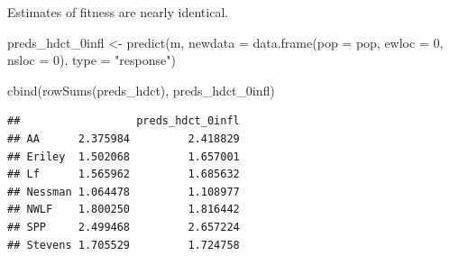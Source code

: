 \documentclass[
  ignorenonframetext,
]{beamer}
\newenvironment{Shaded}{\begin{snugshade}}{\end{snugshade}}
\newcommand{\AttributeTok}[1]{\textcolor[rgb]{0.77,0.63,0.00}{#1}}
\newcommand{\DecValTok}[1]{\textcolor[rgb]{0.00,0.00,0.81}{#1}}
\newcommand{\FunctionTok}[1]{\textcolor[rgb]{0.00,0.00,0.00}{#1}}
\newcommand{\NormalTok}[1]{#1}
\newcommand{\OtherTok}[1]{\textcolor[rgb]{0.56,0.35,0.01}{#1}}
\newcommand{\StringTok}[1]{\textcolor[rgb]{0.31,0.60,0.02}{#1}}
\begin{document}
\begin{frame}[fragile]{}
\protect\hypertarget{section-45}{}
Estimates of fitness are nearly identical.

\vspace{12pt}
\tiny

\begin{Shaded}
\begin{Highlighting}[]
\NormalTok{preds\_hdct\_0infl }\OtherTok{\textless{}{-}} \FunctionTok{predict}\NormalTok{(m, }
  \AttributeTok{newdata =} \FunctionTok{data.frame}\NormalTok{(}\AttributeTok{pop =}\NormalTok{ pop, }\AttributeTok{ewloc =} \DecValTok{0}\NormalTok{, }\AttributeTok{nsloc =} \DecValTok{0}\NormalTok{), }
  \AttributeTok{type =} \StringTok{"response"}\NormalTok{)}

\FunctionTok{cbind}\NormalTok{(}\FunctionTok{rowSums}\NormalTok{(preds\_hdct), preds\_hdct\_0infl)}
\end{Highlighting}
\end{Shaded}

\begin{verbatim}
##                  preds_hdct_0infl
## AA      2.375984         2.418829
## Eriley  1.502068         1.657001
## Lf      1.565962         1.685632
## Nessman 1.064478         1.108977
## NWLF    1.800250         1.816442
## SPP     2.499468         2.657224
## Stevens 1.705529         1.724758
\end{verbatim}
\end{frame}
\end{document}
